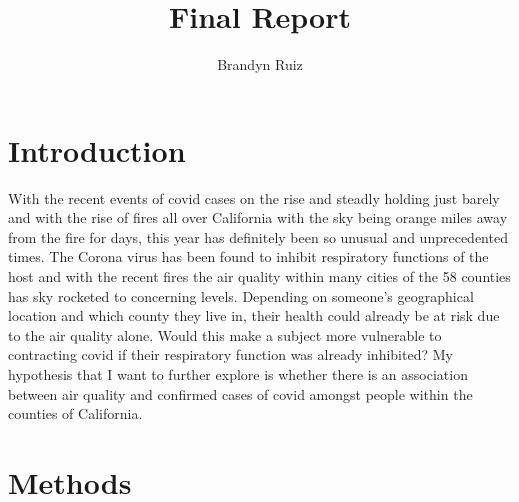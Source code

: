 \documentclass[
]{article}
\title{Final Report}
\author{Brandyn Ruiz}
\date{}
\begin{document}
\maketitle

\hypertarget{introduction}{%
\section{Introduction}\label{introduction}}

With the recent events of covid cases on the rise and steadly holding
just barely and with the rise of fires all over California with the sky
being orange miles away from the fire for days, this year has definitely
been so unusual and unprecedented times. The Corona virus has been found
to inhibit respiratory functions of the host and with the recent fires
the air quality within many cities of the 58 counties has sky rocketed
to concerning levels. Depending on someone's geographical location and
which county they live in, their health could already be at risk due to
the air quality alone. Would this make a subject more vulnerable to
contracting covid if their respiratory function was already inhibited?
My hypothesis that I want to further explore is whether there is an
association between air quality and confirmed cases of covid amongst
people within the counties of California.

\hypertarget{methods}{%
\section{Methods}\label{methods}}
\end{document}
